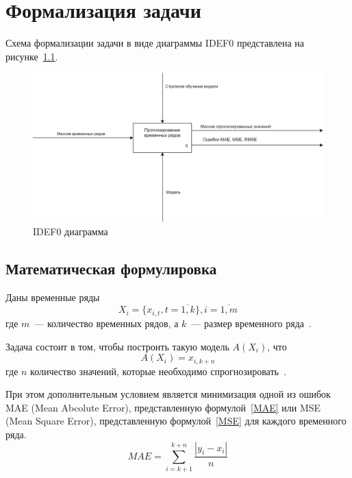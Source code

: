 \documentclass[a4paper, 14pt]{extreport}
\begin{document}
\chapter{Формализация задачи}

Схема формализации задачи в виде диаграммы IDEF0 представлена на рисунке~\ref{idef}.

\begin{figure}[h]
	\centering
	\includegraphics[scale=0.55]{tools/idef.png}
	\caption{IDEF0 диаграмма}
	\label{idef}
\end{figure}

\section{Математическая формулировка}

Даны временные ряды 
\begin{equation}
	X_{i} =\{x_{i,t}, t = \overline{1,k}\}, i = \overline{1, m}
\end{equation}
где $m$~--- количество временных рядов, а $k$~--- размер временного ряда~\cite{mayorova}.

Задача состоит в том, чтобы построить такую модель $A(X_{i})$, что
\begin{equation}
	 A(X_{i}) = x_{i,k+n}
\end{equation}
где $n$ количество значений, которые необходимо спрогнозировать~\cite{mayorova}.

При этом дополнительным условием является минимизация одной из ошибок MAE (Mean Abcolute Error), представленную 
формулой~\ref{MAE} или MSE (Mean Square Error), представленную формулой~\ref{MSE} для каждого временного ряда.
\begin{equation}
	\label{MAE}
	 MAE = \sum \limits _{i=k+1}^{k+n} \frac{|y_{i}-x_{i}|}{n}
\end{equation}
\end{document}
